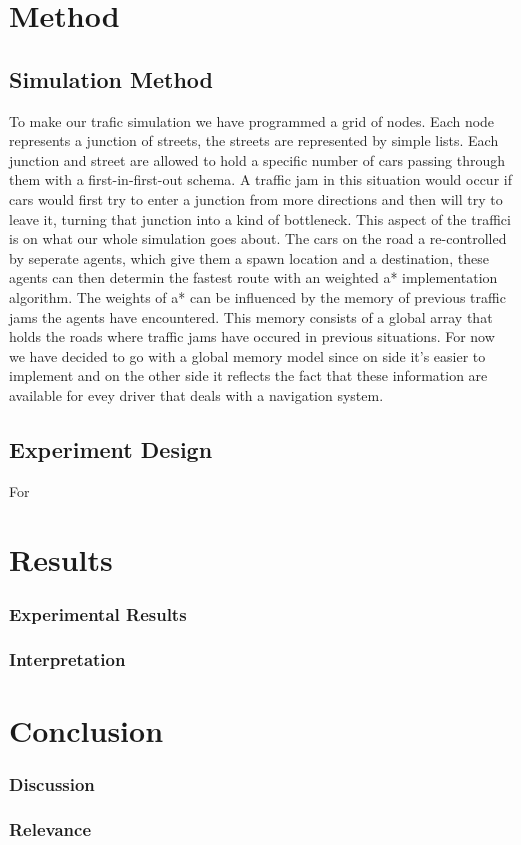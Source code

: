 \documentclass{article}
\begin{document}
\section{Method}

  \subsection{Simulation Method}
To make our trafic simulation we have programmed a grid of nodes. Each node represents a junction of streets, the streets are represented by simple lists. Each junction and street are allowed to hold a specific number of cars passing through them with a first-in-first-out schema. A traffic jam in this situation would occur if cars would first try to enter a junction from more directions and then will try to leave it, turning that junction into a kind of bottleneck. This aspect of the traffici is on what our whole simulation goes about. The cars on the road a re-controlled by seperate agents, which give them a spawn location and a destination, these agents can then determin the fastest route with an weighted a* implementation algorithm. The weights of a* can be influenced by the memory of previous traffic jams the agents have encountered. This memory consists of a global array that holds the roads where traffic jams have occured in previous situations. For now we have decided to go with a global memory model since on side it's easier to implement and on the other side it reflects the fact that these information are available for evey driver that deals with a navigation system. 

  \subsection{Experiment Design}
For

\section{Results}

	\subsubsection{Experimental Results}
	
	\subsubsection{Interpretation}
  

\section{Conclusion}

	\subsubsection{Discussion}

	\subsubsection{Relevance}



\end{document}

